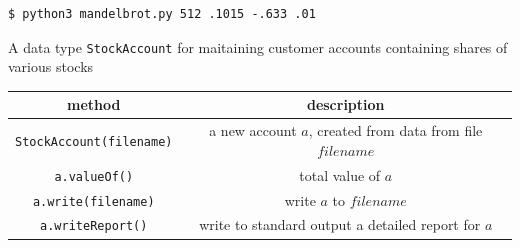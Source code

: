 \documentclass[8pt,a4paper,compress]{beamer}
\begin{document}
\begin{frame}[fragile]
\begin{minipage}{200pt}
\begin{lstlisting}[language={},style=focusin]
$ python3 mandelbrot.py 512 .1015 -.633 .01
\end{lstlisting}
\end{minipage}%
\hfill
\begin{minipage}{100pt}
\begin{center}
\end{center}
\end{minipage}%
\end{frame}

\begin{frame}[fragile]
\pause

A data type \lstinline{StockAccount} for maitaining customer accounts containing shares of various stocks
\begin{center}
\begin{tabular}{cc}
method & description \\ \hline
\lstinline$StockAccount(filename)$ & a new account $a$, created from data from file $filename$ \\
\lstinline$a.valueOf()$ & total value of $a$ \\
\lstinline$a.write(filename)$ & write $a$ to $filename$ \\
\lstinline$a.writeReport()$ & write to standard output a detailed report for $a$
\end{tabular} 
\end{center}
\end{frame}
\end{document}
